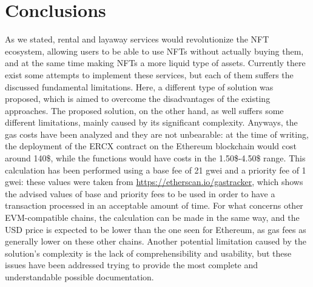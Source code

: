 \documentclass[english, LaM, oneside]{sapthesis}%
\begin{document}
\chapter{Conclusions}
As we stated, rental and layaway services would revolutionize the NFT ecosystem, allowing users to be able to use NFTs without actually buying them, and at the same time making NFTs a more liquid type of assets. \newline
Currently there exist some attempts to implement these services, but each of them suffers the discussed fundamental limitations. Here, a different type of solution was proposed, which is aimed to overcome the disadvantages of the existing approaches. The proposed solution, on the other hand, as well suffers some different limitations, mainly caused by its significant complexity. Anyways, the gas costs have been analyzed and they are not unbearable: at the time of writing, the deployment of the ERCX contract on the Ethereum blockchain would cost around 140\$, while the functions would have costs in the 1.50\$-4.50\$ range. This calculation has been performed using a base fee of 21 gwei and a priority fee of 1 gwei: these values were taken from \url{https://etherscan.io/gastracker}, which shows the advised values of base and priority fees to be used in order to have a transaction processed in an acceptable amount of time. For what concerns other EVM-compatible chains, the calculation can be made in the same way, and the USD price is expected to be lower than the one seen for Ethereum, as gas fees as generally lower on these other chains.\newline
Another potential limitation caused by the solution's complexity is the lack of comprehensibility and usability, but these issues have been addressed trying to provide the most complete and understandable possible documentation. 
\end{document}
